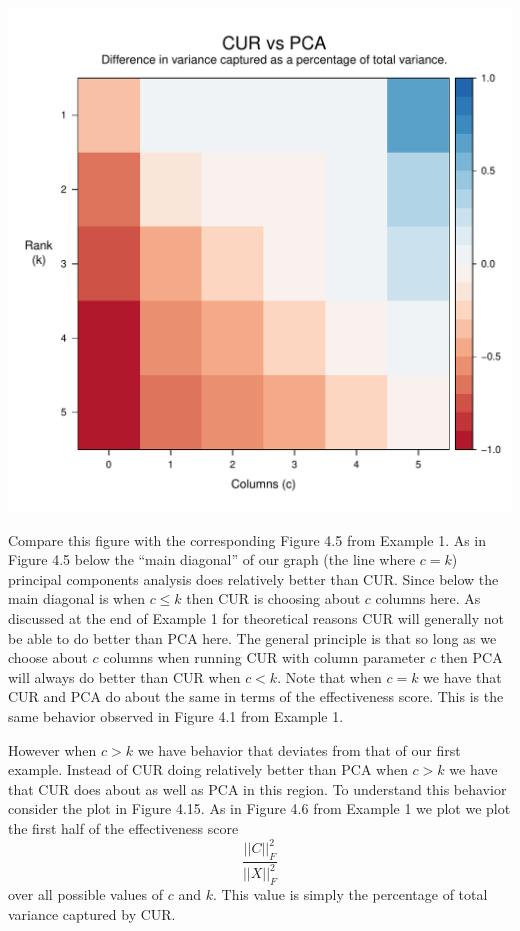 \documentclass{book}
\begin{document}
\begin{center}
\includegraphics[scale=.63]{./Figures/diag_ex_2/raster.pdf}%
\end{center}

Compare this figure with the corresponding Figure 4.5 from Example 1. As in Figure 4.5 below the ``main diagonal'' of our graph (the line where $c=k$) principal components analysis does relatively better than CUR. Since below the main diagonal is when $c\leq k$ then CUR is choosing about $c$ columns here. As discussed at the end of Example 1 for theoretical reasons CUR will generally not be able to do better than PCA here. The general principle is that so long as we choose about $c$ columns when running CUR with column parameter $c$ then PCA will always do better than CUR when $c<k$. Note that when $c=k$ we have that CUR and PCA do about the same in terms of the effectiveness score. This is the same behavior observed in Figure 4.1 from Example 1.

However when $c>k$ we have behavior that deviates from that of our first example. Instead of CUR doing relatively better than PCA when $c>k$ we have that CUR does about as well as PCA in this region. To understand this behavior consider the plot in Figure 4.15. As in Figure 4.6 from Example 1 we plot we plot the first half of the effectiveness score
$$
\frac{||C||_F^2}{||X||_F^2}
$$
over all possible values of $c$ and $k$. This value is simply the percentage of total variance captured by CUR. 
\end{document}
